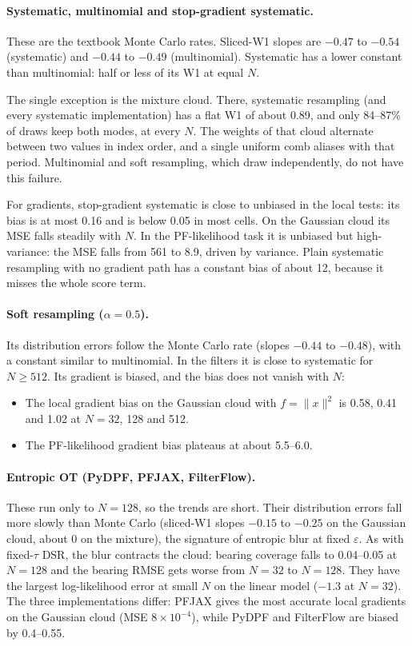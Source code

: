\paragraph{Systematic, multinomial and stop-gradient systematic.}
These are the textbook Monte Carlo rates. Sliced-W1 slopes are $-0.47$ to $-0.54$ (systematic) and $-0.44$ to $-0.49$ (multinomial). Systematic has a lower constant than multinomial: half or less of its W1 at equal $N$.

The single exception is the mixture cloud. There, systematic resampling (and every systematic implementation) has a flat W1 of about 0.89, and only 84--87\% of draws keep both modes, at every $N$. The weights of that cloud alternate between two values in index order, and a single uniform comb aliases with that period. Multinomial and soft resampling, which draw independently, do not have this failure.

For gradients, stop-gradient systematic is close to unbiased in the local tests: its bias is at most 0.16 and is below 0.05 in most cells. On the Gaussian cloud its MSE falls steadily with $N$. In the PF-likelihood task it is unbiased but high-variance: the MSE falls from 561 to 8.9, driven by variance. Plain systematic resampling with no gradient path has a constant bias of about 12, because it misses the whole score term.

\paragraph{Soft resampling ($\alpha{=}0.5$).}
Its distribution errors follow the Monte Carlo rate (slopes $-0.44$ to $-0.48$), with a constant similar to multinomial. In the filters it is close to systematic for $N\ge512$. Its gradient is biased, and the bias does not vanish with $N$:
\begin{itemize}
\item The local gradient bias on the Gaussian cloud with $f=\|x\|^2$ is 0.58, 0.41 and 1.02 at $N=32$, 128 and 512.
\item The PF-likelihood gradient bias plateaus at about 5.5--6.0.
\end{itemize}

\paragraph{Entropic OT (PyDPF, PFJAX, FilterFlow).}
These run only to $N{=}128$, so the trends are short. Their distribution errors fall more slowly than Monte Carlo (sliced-W1 slopes $-0.15$ to $-0.25$ on the Gaussian cloud, about $0$ on the mixture), the signature of entropic blur at fixed $\varepsilon$. As with fixed-$\tau$ DSR, the blur contracts the cloud: bearing coverage falls to 0.04--0.05 at $N{=}128$ and the bearing RMSE gets worse from $N{=}32$ to $N{=}128$. They have the largest log-likelihood error at small $N$ on the linear model ($-1.3$ at $N{=}32$). The three implementations differ: PFJAX gives the most accurate local gradients on the Gaussian cloud (MSE $8\times10^{-4}$), while PyDPF and FilterFlow are biased by 0.4--0.55.

